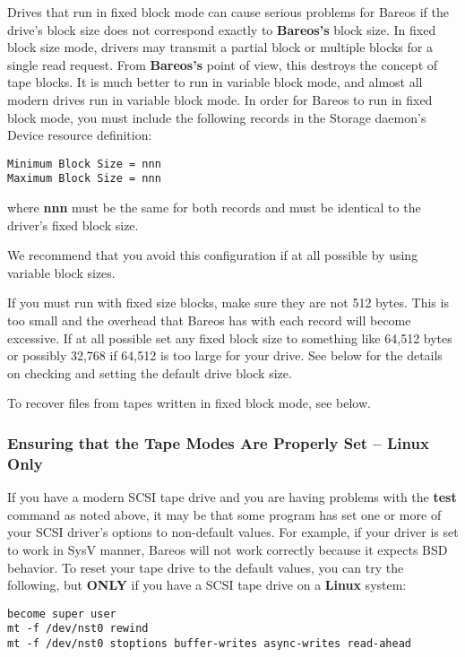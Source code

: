 {Drives that run in fixed block mode can cause serious problems for Bareos if
the drive's block size does not correspond exactly to {\bf Bareos's} block
size. In fixed block size mode, drivers may transmit a partial block or
multiple blocks for a single read request. From {\bf Bareos's} point of view,
this destroys the concept of tape blocks. It is much better to run in variable
block mode, and almost all modern drives run in
variable block mode. In order for Bareos to run in fixed block mode, you must
include the following records in the Storage daemon's Device resource
definition:

\footnotesize
\begin{verbatim}
Minimum Block Size = nnn
Maximum Block Size = nnn
\end{verbatim}
\normalsize

where {\bf nnn} must be the same for both records and must be identical to the
driver's fixed block size.

We recommend that you avoid this configuration if at all possible by using
variable block sizes.

If you must run with fixed size blocks, make sure they are not 512 bytes. This
is too small and the overhead that Bareos has with each record will become
excessive. If at all possible set any fixed block size to something like
64,512 bytes or possibly 32,768 if 64,512 is too large for your drive. See
below for the details on checking and setting the default drive block size.

To recover files from tapes written in fixed block mode, see below.

\label{TapeModes}
\subsubsection{Ensuring that the Tape Modes Are Properly Set -- {\bf Linux
Only}}

If you have a modern SCSI tape drive and you are having problems with the {\bf
test} command as noted above, it may be that some program has set one or more
of your SCSI driver's options to non-default values. For example, if your
driver is set to work in SysV manner, Bareos will not work correctly because
it expects BSD behavior. To reset your tape drive to the default values, you
can try the following, but {\bf ONLY} if you have a SCSI tape drive on a {\bf
Linux} system:

\footnotesize
\begin{verbatim}
become super user
mt -f /dev/nst0 rewind
mt -f /dev/nst0 stoptions buffer-writes async-writes read-ahead
\end{verbatim}
\normalsize

}
